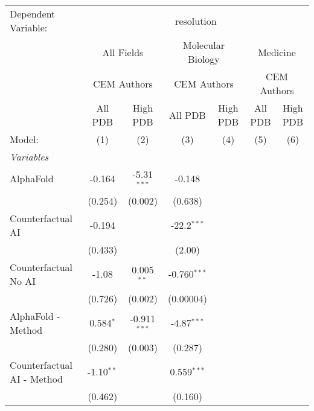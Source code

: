 \begingroup
\centering
\begin{tabular}{lcccccc}
   \tabularnewline \midrule \midrule
   Dependent Variable: & \multicolumn{6}{c}{resolution}\\
 & \multicolumn{2}{c}{All Fields} & \multicolumn{2}{c}{Molecular Biology} & \multicolumn{2}{c}{Medicine} \\
\cmidrule(lr){2-3} \cmidrule(lr){4-5} \cmidrule(lr){6-7}
 & \multicolumn{2}{c}{CEM Authors} & \multicolumn{2}{c}{CEM Authors} & \multicolumn{2}{c}{CEM Authors} \\
\cmidrule(lr){2-3} \cmidrule(lr){4-5} \cmidrule(lr){6-7}
 & \multicolumn{1}{c}{All PDB} & \multicolumn{1}{c}{High PDB} & \multicolumn{1}{c}{All PDB} & \multicolumn{1}{c}{High PDB} & \multicolumn{1}{c}{All PDB} & \multicolumn{1}{c}{High PDB} \\
\cmidrule(lr){2-2} \cmidrule(lr){3-3} \cmidrule(lr){4-4} \cmidrule(lr){5-5} \cmidrule(lr){6-6} \cmidrule(lr){7-7}
   Model:                                   & (1)          & (2)            & (3)            & (4) & (5) & (6)\\  
   \midrule
   \emph{Variables}\\
   AlphaFold                                & -0.164       & -5.31$^{***}$  & -0.148         &     &     &   \\   
                                            & (0.254)      & (0.002)        & (0.638)        &     &     &   \\   
   Counterfactual AI                        & -0.194       &                & -22.2$^{***}$  &     &     &   \\   
                                            & (0.433)      &                & (2.00)         &     &     &   \\   
   Counterfactual No AI                     & -1.08        & 0.005$^{**}$   & -0.760$^{***}$ &     &     &   \\   
                                            & (0.726)      & (0.002)        & (0.00004)      &     &     &   \\   
   AlphaFold - Method                       & 0.584$^{*}$  & -0.911$^{***}$ & -4.87$^{***}$  &     &     &   \\   
                                            & (0.280)      & (0.003)        & (0.287)        &     &     &   \\   
   Counterfactual AI - Method               & -1.10$^{**}$ &                & 0.559$^{***}$  &     &     &   \\   
                                            & (0.462)      &                & (0.160)        &     &     &   \\   

\end{tabular}
